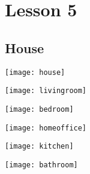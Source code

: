 \documentclass{tstextbook}
\begin{document}
	
	
	\chapter{Lesson 5}
	
	\section{House}
	
	\texttt{[image: house]}

	\texttt{[image: livingroom]}
	
	\texttt{[image: bedroom]}
	
	\texttt{[image: homeoffice]}
	
	\texttt{[image: kitchen]}
	
	\texttt{[image: bathroom]}
	
	
	
	
	\printindex
	
\end{document}
